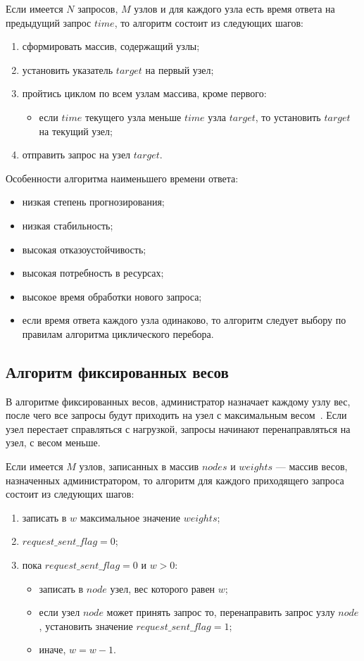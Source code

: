 Если имеется $N$ запросов, $M$ узлов и для каждого узла есть время ответа на предыдущий запрос $time$, то алгоритм состоит из следующих шагов:

\begin{enumerate}
	\item сформировать массив, содержащий узлы;
	\item установить указатель $target$ на первый узел;
	\item пройтись циклом по всем узлам массива, кроме первого:
	\begin{itemize}
		\item если $time$ текущего узла меньше $time$ узла $target$, то установить $target$ на текущий узел; 
	\end{itemize}
	\item отправить запрос на узел $target$.
\end{enumerate}

Особенности алгоритма наименьшего времени ответа:
\begin{itemize}
	\item низкая степень прогнозирования; 
	\item низкая стабильность;
	\item высокая отказоустойчивость;
	\item высокая потребность в ресурсах;
	\item высокое время обработки нового запроса;
	\item если время ответа каждого узла одинаково, то алгоритм следует выбору по правилам алгоритма циклического перебора.
\end{itemize}

\subsection{Алгоритм фиксированных весов}

В алгоритме фиксированных весов, администратор назначает каждому узлу вес, после чего все запросы будут приходить на узел с максимальным весом~\cite{kemp}.
Если узел перестает справляться с нагрузкой, запросы начинают перенаправляться на узел, с весом меньше.

Если имеется $M$ узлов, записанных в массив $nodes$ и $weights$ --- массив весов, назначенных администратором, то алгоритм для каждого приходящего запроса состоит из следующих шагов:
\begin{enumerate}
	\item записать в $w$ максимальное значение $weights$;
	\item $request\_sent\_flag = 0$;
	\item пока $request\_sent\_flag = 0$ и $w > 0$:
	\begin{itemize}
		\item записать в $node$ узел, вес которого равен $w$;
		\item если узел $node$ может принять запрос то, перенаправить запрос узлу $node$, установить значение $request\_sent\_flag = 1$;
		\item иначе, $w = w - 1$.
	\end{itemize}
\end{enumerate}

